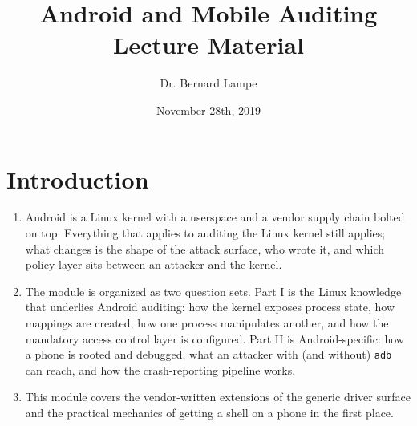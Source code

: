 \documentclass[12pt]{Training}
\title{Android and Mobile Auditing Lecture Material}
\author{Dr. Bernard Lampe}
\date{November 28th, 2019}
\begin{document}
\maketitle


\section*{Introduction}
\begin{enumerate}
    \item Android is a Linux kernel with a userspace and a vendor supply chain bolted on top. Everything that applies to auditing the Linux kernel still applies; what changes is the shape of the attack surface, who wrote it, and which policy layer sits between an attacker and the kernel.
    \item The module is organized as two question sets. Part I is the Linux knowledge that underlies Android auditing: how the kernel exposes process state, how mappings are created, how one process manipulates another, and how the mandatory access control layer is configured. Part II is Android-specific: how a phone is rooted and debugged, what an attacker with (and without) \lstinline{adb} can reach, and how the crash-reporting pipeline works.
    \item This module covers the vendor-written extensions of the generic driver surface and the practical mechanics of getting a shell on a phone in the first place.
\end{enumerate}

\end{document}
